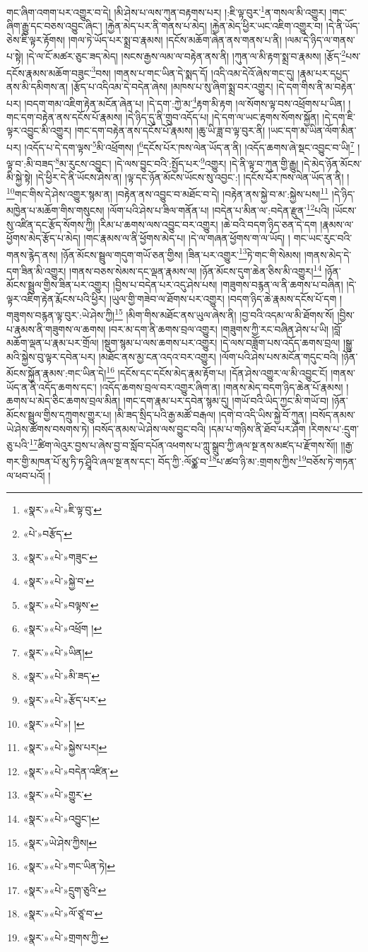 གང་ཞིག་འགག་པར་འགྱུར་བ་དེ། །མི་ཤེས་པ་ལས་ཀུན་བརྟགས་པར། །:ཇི་ལྟ་བུར་\footnote{«སྣར་»«པེ་»ཇི་ལྟ་བུ་}ན་གསལ་མི་འགྱུར། །གང་ཞིག་རྒྱུ་དང་བཅས་འབྱུང་ཞིང་། །རྐྱེན་མེད་པར་ནི་གནས་པ་མེད། །རྐྱེན་མེད་ཕྱིར་ཡང་འཇིག་འགྱུར་བ། །དེ་ནི་ཡོད་ཅེས་ཇི་ལྟར་རྟོགས། །གལ་ཏེ་ཡོད་པར་སྨྲ་བ་རྣམས། །དངོས་མཆོག་ཞེན་ནས་གནས་པ་ནི། །ལམ་དེ་ཉིད་ལ་གནས་པ་སྟེ། །དེ་ལ་ངོ་མཚར་ཅུང་ཟད་མེད། །སངས་རྒྱས་ལམ་ལ་བརྟེན་ནས་ནི། །ཀུན་ལ་མི་རྟག་སྨྲ་བ་རྣམས། །རྩོད་\footnote{«པེ་»བརྩོད་}པས་དངོས་རྣམས་མཆོག་བཟུང་\footnote{«སྣར་»«པེ་»གཟུང་}བས། །གནས་པ་གང་ཡིན་དེ་སྨད་དོ། །འདི་འམ་དེའོ་ཞེས་གང་དུ། །རྣམ་པར་དཔྱད་ནས་མི་དམིགས་ན། །རྩོད་པ་འདིའམ་དེ་བདེན་ཞེས། །མཁས་པ་སུ་ཞིག་སྨྲ་བར་འགྱུར། །དེ་དག་གིས་ནི་མ་བརྟེན་པར། །བདག་གམ་འཇིག་རྟེན་མངོན་ཞེན་པ། །དེ་དག་:ཀྱེ་མ་\footnote{«སྣར་»«པེ་»སྐྱེ་བ་}རྟག་མི་རྟག །ལ་སོགས་ལྟ་བས་འཕྲོགས་པ་ཡིན། །གང་དག་བརྟེན་ནས་དངོས་པོ་རྣམས། །དེ་ཉིད་དུ་ནི་གྲུབ་འདོད་པ། །དེ་དག་ལ་ཡང་རྟགས་སོགས་སྐྱོན། །དེ་དག་ཇི་ལྟར་འབྱུང་མི་འགྱུར། །གང་དག་བརྟེན་ནས་དངོས་པོ་རྣམས། །ཆུ་ཡི་ཟླ་བ་ལྟ་བུར་ནི། །ཡང་དག་མ་ཡིན་ལོག་མིན་པར། །འདོད་པ་དེ་དག་ལྟས་\footnote{«སྣར་»«པེ་»བལྟས་}མི་འཕྲོགས། །\footnote{«སྣར་»«པེ་»འཕྲོག །}དངོས་པོར་ཁས་ལེན་ཡོད་ན་ནི། །འདོད་ཆགས་ཞེ་སྡང་འབྱུང་བ་ཡི།\footnote{«སྣར་»«པེ་»ཡིན།} །ལྟ་བ་:མི་བཟད་\footnote{«སྣར་»«པེ་»མི་ཟད་}མ་རུངས་འབྱུང་། །དེ་ལས་བྱུང་བའི་:སྤྱོད་པར་\footnote{«སྣར་»«པེ་»རྩོད་པར་}འགྱུར། །དེ་ནི་ལྟ་བ་ཀུན་གྱི་རྒྱུ། །དེ་མེད་ཉོན་མོངས་མི་སྐྱེ་སྟེ། །དེ་ཕྱིར་དེ་ནི་ཡོངས་ཤེས་ན། །ལྟ་དང་ཉོན་མོངས་ཡོངས་སུ་འབྱང་:། །དངོས་པོར་ཁས་ལེན་ཡོད་ན་ནི། །\footnote{«སྣར་»«པེ་»། །}གང་གིས་དེ་ཤེས་འགྱུར་སྙམ་ན། །བརྟེན་ནས་འབྱུང་བ་མཐོང་བ་དེ། །བརྟེན་ནས་སྐྱེ་བ་མ་:སྐྱེས་པས།\footnote{«སྣར་»«པེ་»སྐྱེས་པར།} །དེ་ཉིད་མཁྱེན་པ་མཆོག་གིས་གསུངས། །ལོག་པའི་ཤེས་པ་ཟིལ་གནོན་པ། །བདེན་པ་མིན་ལ་:བདེན་རྫུན་\footnote{«སྣར་»«པེ་»བདེན་འཛིན་}པའི། །ཡོངས་སུ་འཛིན་དང་རྩོད་སོགས་ཀྱི། །རིམ་པ་ཆགས་ལས་འབྱུང་བར་འགྱུར། །ཆེ་བའི་བདག་ཉིད་ཅན་དེ་དག །རྣམས་ལ་ཕྱོགས་མེད་རྩོད་པ་མེད། །གང་རྣམས་ལ་ནི་ཕྱོགས་མེད་པ། །དེ་ལ་གཞན་ཕྱོགས་ག་ལ་ཡོད། །
གང་ཡང་རུང་བའི་གནས་རྙེད་ནས། །ཉོན་མོངས་སྦྲུལ་གདུག་གཡོ་ཅན་གྱིས། །ཟིན་པར་འགྱུར་\footnote{«སྣར་»«པེ་»གྱུར་}ཏེ་གང་གི་སེམས། །གནས་མེད་དེ་དག་ཟིན་མི་འགྱུར། །གནས་བཅས་སེམས་དང་ལྡན་རྣམས་ལ། །ཉོན་མོངས་དུག་ཆེན་ཅིས་མི་འགྱུར།\footnote{«སྣར་»«པེ་»འབྱུང་།} །ཉོན་མོངས་སྦྲུལ་གྱིས་ཟིན་པར་འགྱུར། །བྱིས་པ་བདེན་པར་འདུ་ཤེས་པས། །གཟུགས་བརྙན་ལ་ནི་ཆགས་པ་བཞིན། །དེ་ལྟར་འཇིག་རྟེན་རྨོངས་པའི་ཕྱིར། །ཡུལ་གྱི་གཟེབ་ལ་ཐོགས་པར་འགྱུར། །བདག་ཉིད་ཆེ་རྣམས་དངོས་པོ་དག །གཟུགས་བརྙན་ལྟ་བུར་:ཡེ་ཤེས་ཀྱི།\footnote{«སྣར་»ཡེ་ཤེས་ཀྱིས།} །མིག་གིས་མཐོང་ནས་ཡུལ་ཞེས་ནི། །བྱ་བའི་འདམ་ལ་མི་ཐོགས་སོ། །བྱིས་པ་རྣམས་ནི་གཟུགས་ལ་ཆགས། །བར་མ་དག་ནི་ཆགས་བྲལ་འགྱུར། །གཟུགས་ཀྱི་རང་བཞིན་ཤེས་པ་ཡི། །བློ་མཆོག་ལྡན་པ་རྣམ་པར་གྲོལ། །སྡུག་སྙམ་པ་ལས་ཆགས་པར་འགྱུར། །དེ་ལས་བཟློག་པས་འདོད་ཆགས་བྲལ། །སྒྱུ་མའི་སྐྱེས་བུ་ལྟར་དབེན་པར། །མཐོང་ནས་མྱ་ངན་འདའ་བར་འགྱུར། །ལོག་པའི་ཤེས་པས་མངོན་གདུང་བའི། །ཉོན་མོངས་སྐྱོན་རྣམས་:གང་ཡིན་དེ།\footnote{«སྣར་»«པེ་»གང་ཡིན་ཏེ།} །དངོས་དང་དངོས་མེད་རྣམ་རྟོག་པ། །དོན་ཤེས་འགྱུར་ལ་མི་འབྱུང་ངོ། །གནས་ཡོད་ན་ནི་འདོད་ཆགས་དང་། །འདོད་ཆགས་བྲལ་བར་འགྱུར་ཞིག་ན། །གནས་མེད་བདག་ཉིད་ཆེན་པོ་རྣམས། །ཆགས་པ་མེད་ཅིང་ཆགས་བྲལ་མིན། །གང་དག་རྣམ་པར་དབེན་སྙམ་དུ། །གཡོ་བའི་ཡིད་ཀྱང་མི་གཡོ་བ། །ཉོན་མོངས་སྦྲུལ་གྱིས་དཀྲུགས་གྱུར་པ། །མི་ཟད་སྲིད་པའི་རྒྱ་མཚོ་བརྒལ། །དགེ་བ་འདི་ཡིས་སྐྱེ་བོ་ཀུན། །བསོད་ནམས་ཡེ་ཤེས་ཚོགས་བསགས་ཏེ། །བསོད་ནམས་ཡེ་ཤེས་ལས་བྱུང་བའི། །དམ་པ་གཉིས་ནི་ཐོབ་པར་ཤོག །རིགས་པ་:དྲུག་ཅུ་པའི་\footnote{«སྣར་»«པེ་»དྲུག་ཅུའི་}ཚིག་ལེའུར་བྱས་པ་ཞེས་བྱ་བ་སློབ་དཔོན་འཕགས་པ་ཀླུ་སྒྲུབ་ཀྱི་ཞལ་སྔ་ནས་མཛད་པ་རྫོགས་སོ།། །།རྒྱ་གར་གྱི་མཁན་པོ་མུ་ཏི་ཏ་ཤྲཱིའི་ཞལ་སྔ་ནས་དང་། བོད་ཀྱི་:ལོཙྪ་བ་\footnote{«སྣར་»«པེ་»ལོ་ཙཱ་བ་}པ་ཚབ་ཉི་མ་:གྲགས་ཀྱིས་\footnote{«སྣར་»«པེ་»གྲགས་ཀྱི་}བཅོས་ཏེ་གཏན་ལ་ཕབ་པའོ། ། 